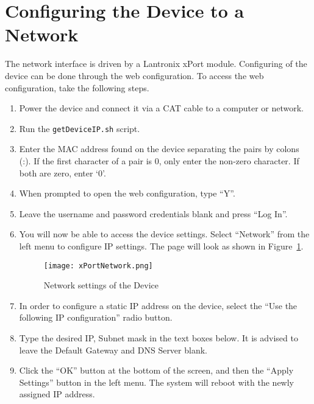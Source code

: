 \section{Configuring the Device to a Network} %
\label{sec:configuring_the_device_on_a_network}
The network interface is driven by a Lantronix xPort module. Configuring of the device can be done through the web configuration. To access the web configuration, take the following steps.
\begin{enumerate}
	\item Power the device and connect it via a CAT cable to a computer or network.
	\item Run the \texttt{getDeviceIP.sh} script.
	\item Enter the MAC address found on the device separating the pairs by colons (:). If the first character of a pair is 0, only enter the non-zero character. If both are zero, enter `0'.
	\item When prompted to open the web configuration, type ``Y''.
	\item Leave the username and password credentials blank and press ``Log In''.
	\item You will now be able to access the device settings. Select ``Network'' from the left menu to configure IP settings. The page will look as shown in Figure~\ref{fig:xnet}.
	\begin{figure}[tbh!]
		\centering
		\texttt{[image: xPortNetwork.png]}
		\caption{Network settings of the Device}
		\label{fig:xnet}
	\end{figure}
	\item In order to configure a static IP address on the device, select the ``Use the following IP configuration'' radio button.
	\item Type the desired IP, Subnet mask in the text boxes below. It is advised to leave the Default Gateway and DNS Server blank.
	\item Click the ``OK'' button at the bottom of the screen, and then the ``Apply Settings'' button in the left menu. The system will reboot with the newly assigned IP address.
\end{enumerate}

